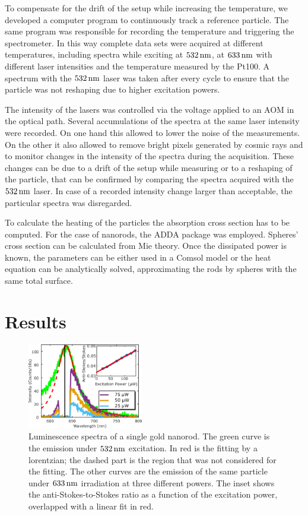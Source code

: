 To compensate for the drift of the setup while increasing the temperature, we
developed a computer program to continuously track a reference particle. The
same program was responsible for recording the temperature and triggering the
spectrometer. In this way complete data sets were acquired at different
temperatures, including spectra while exciting at $532\,\textrm{nm}$, at $633\,\textrm{nm}$ with
different laser intensities and the temperature measured by the Pt100. A
spectrum with the $532\,\textrm{nm}$ laser was taken after every cycle to ensure that the
particle was not reshaping due to higher excitation powers.

The intensity of the lasers was controlled via the voltage applied to an AOM in
the optical path. Several accumulations of the spectra at the same laser
intensity were recorded. On one hand this allowed to lower the noise of the
measurements. On the other it also allowed to remove bright pixels generated by
cosmic rays and to monitor changes in the intensity of the spectra during the
acquisition. These changes can be due to a drift of the setup while measuring or
to a reshaping of the particle, that can be confirmed by comparing the spectra
acquired with the $532\,\textrm{nm}$ laser. In case of a recorded intensity change larger
than acceptable, the particular spectra was disregarded.

To calculate the heating of the particles the absorption cross section has to be
computed. For the case of nanorods, the ADDA package was
employed\cite{Yurkin2011}. Spheres' cross section can be calculated from Mie
theory. Once the dissipated power is known, the parameters can be either used in
a Comsol model or the heat equation can be analytically solved, approximating
the rods by spheres with the same total surface.

\section{Results}
\begin{figure}[htp] \centering
\includegraphics[width=0.45\textwidth]{Chapters/04_Anti-Stokes/Figures/02_Several_Intensities/02_several_intensities.png}
\caption{Luminescence spectra of a single gold nanorod. The green curve is the
emission under $532\,\textrm{nm}$ excitation. In red is the fitting by a lorentzian; the
dashed part is the region that was not considered for the fitting. The other
curves are the emission of the same particle under $633\,\textrm{nm}$ irradiation at three 
different powers. The inset shows the anti-Stokes-to-Stokes ratio as a function
of the excitation power, overlapped with a linear fit in red.}
	\label{fig:spectra_rod}
\end{figure}

